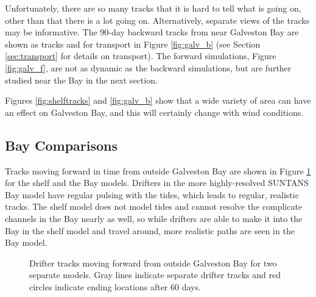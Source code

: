 \documentclass[11pt]{article}
\begin{document}
Unfortunately, there are so many tracks that it is hard to tell what is going on, other than that there is a lot going on. Alternatively, separate views of the tracks may be informative. The 90-day backward tracks from near Galveston Bay are shown as tracks and for transport in Figure \ref{fig:galv_b} (see Section \ref{sec:transport} for details on transport). The forward simulations, Figure \ref{fig:galv_f}, are not as dynamic as the backward simulations, but are further studied near the Bay in the next section.

Figures \ref{fig:shelftracks} and \ref{fig:galv_b} show that a wide variety of area can have an effect on Galveston Bay, and this will certainly change with wind conditions.

\subsection{Bay Comparisons}

Tracks moving forward in time from outside Galveston Bay are shown in Figure \ref{fig:baytracks} for the shelf and the Bay models. Drifters in the more highly-resolved SUNTANS Bay model have regular pulsing with the tides, which leads to regular, realistic tracks. The shelf model does not model tides and cannot resolve the complicate channels in the Bay nearly as well, so while drifters are able to make it into the Bay in the shelf model and travel around, more realistic paths are seen in the Bay model.

\begin{figure}
    \centering
    \caption{Drifter tracks moving forward from outside Galveston Bay for two separate models. Gray lines indicate separate drifter tracks and red circles indicate ending locations after 60 days.}
    \label{fig:baytracks}
\end{figure}
\end{document}

